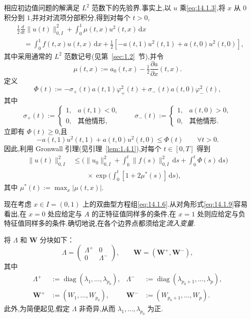 相应初边值问题的解满足 \(L^2\) 范数下的先验界.事实上,以 \(u\) 乘\eqref{eq:14.1.3},将 \(x\) 从 \(0\) 积分到 \(1\),并对对流项分部积分,得到对每个 \(t>0\),
\[
  \begin{aligned}
    &\frac12\frac{d}{dt}\|u(t)\|_{0,I}^2+\int_0^1\mu(t,x)u^2(t,x)\,\mathrm dx\\
    &\quad=\int_0^1f(t,x)u(t,x)\,\mathrm dx
          +\tfrac12[-a(t,1)u^2(t,1)+a(t,0)u^2(t,0)],
  \end{aligned}
\]
其中采用通常的 \(L^2\) 范数记号(见第~\ref{sec:1.2}~节),并令
\[
  \mu(t,x):=a_0(t,x)-\tfrac12\frac{\partial a}{\partial x}(t,x).
\]
定义
\[
  \Phi(t):=-\sigma_+(t)a(t,1)\varphi_+^2(t)+\sigma_-(t)a(t,0)\varphi_-^2(t),
\]
其中
\[
  \sigma_+(t):=\begin{cases}1,&a(t,1)<0,\\0,&\text{其他情形},\end{cases}
  \qquad
  \sigma_-(t):=\begin{cases}1,&a(t,0)>0,\\0,&\text{其他情形}.\end{cases}
\]
立即有 \(\Phi(t)\ge0\),且
\[
  -a(t,1)u^2(t,1)+a(t,0)u^2(t,0)\le\Phi(t)\qquad\forall t>0.
\]
因此,利用 Gronwall 引理(见引理~\ref{lem:1.4.1}),对每个 \(t\in[0,T]\) 得到
\[
  \begin{aligned}
    \|u(t)\|_{0,I}^2
      &\le\biggl(\|u_0\|_{0,I}^2+\int_0^t\|f(s)\|_{0,I}^2\,\mathrm ds
                         +\int_0^t\Phi(s)\,\mathrm ds\biggr)\\
      &\qquad\times\exp\biggl(\int_0^t[1+2\mu^*(s)]\,\mathrm ds\biggr),
  \end{aligned}
\]
其中 \(\mu^*(t):=\max_x|\mu(t,x)|\).

现在考虑 \(x\in I=(0,1)\) 上的双曲型方程组\eqref{eq:14.1.6}.从对角形式\eqref{eq:14.1.9}容易看出,在 \(x=0\) 处应给定与 \(A\) 的正特征值同样多的条件,在 \(x=1\) 处则应给定与负特征值同样多的条件.确切地说,在各个边界点都须给定\emph{流入变量}.

将 \(\Lambda\) 和 \(\boldsymbol{W}\) 分块如下：
\begin{equation}\label{eq:14.1.17}
  \Lambda=\begin{pmatrix}\Lambda^+&0\\0&\Lambda^-\end{pmatrix},
  \qquad \boldsymbol{W}=(\boldsymbol{W}^+,\boldsymbol{W}^-),
\end{equation}
其中
\[
  \begin{aligned}
    \Lambda^+&:=\operatorname{diag}(\lambda_1,\ldots,\lambda_{p_0}),
    &\Lambda^-&:=\operatorname{diag}(\lambda_{p_0+1},\ldots,\lambda_p),\\
    \boldsymbol{W}^+&:=(W_1,\ldots,W_{p_0}),
    &\boldsymbol{W}^-&:=(W_{p_0+1},\ldots,W_p).
  \end{aligned}
\]
此外,为简便起见,假定 \(\Lambda\) 非奇异,从而 \(\lambda_1,\ldots,\lambda_{p_0}\) 为正.

